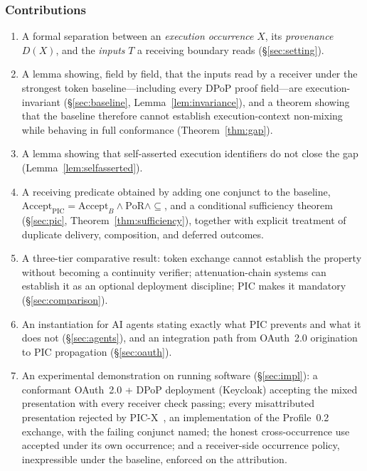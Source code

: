 \documentclass[conference]{IEEEtran}
\newcommand{\Accept}{\mathrm{Accept}}
\newcommand{\PoR}{\mathrm{PoR}}
\begin{document}
\subsubsection*{Contributions}
\begin{enumerate}
\item A formal separation between an \emph{execution occurrence} $X$, its \emph{provenance} $D(X)$, and the \emph{inputs} $T$ a receiving boundary reads (\S\ref{sec:setting}).
\item A lemma showing, field by field, that the inputs read by a receiver under the strongest token baseline---including every DPoP proof field---are execution-invariant (\S\ref{sec:baseline}, Lemma~\ref{lem:invariance}), and a theorem showing that the baseline therefore cannot establish execution-context non-mixing while behaving in full conformance (Theorem~\ref{thm:gap}).
\item A lemma showing that self-asserted execution identifiers do not close the gap (Lemma~\ref{lem:selfasserted}).
\item A receiving predicate obtained by adding one conjunct to the baseline, $\Accept_{\mathrm{PIC}} = \Accept_{B} \wedge \PoR \wedge \subseteq$, and a conditional sufficiency theorem (\S\ref{sec:pic}, Theorem~\ref{thm:sufficiency}), together with explicit treatment of duplicate delivery, composition, and deferred outcomes.
\item A three-tier comparative result: token exchange cannot establish the property without becoming a continuity verifier; attenuation-chain systems can establish it as an optional deployment discipline; PIC makes it mandatory (\S\ref{sec:comparison}).
\item An instantiation for AI agents stating exactly what PIC prevents and what it does not (\S\ref{sec:agents}), and an integration path from OAuth~2.0 origination to PIC propagation (\S\ref{sec:oauth}).
\item An experimental demonstration on running software (\S\ref{sec:impl}): a conformant OAuth~2.0 + DPoP deployment (Keycloak) accepting the mixed presentation with every receiver check passing; every misattributed presentation rejected by PIC-X~\cite{picx}, an implementation of the Profile~0.2 exchange, with the failing conjunct named; the honest cross-occurrence use accepted under its own occurrence; and a receiver-side occurrence policy, inexpressible under the baseline, enforced on the attribution.
\end{enumerate}
\end{document}
